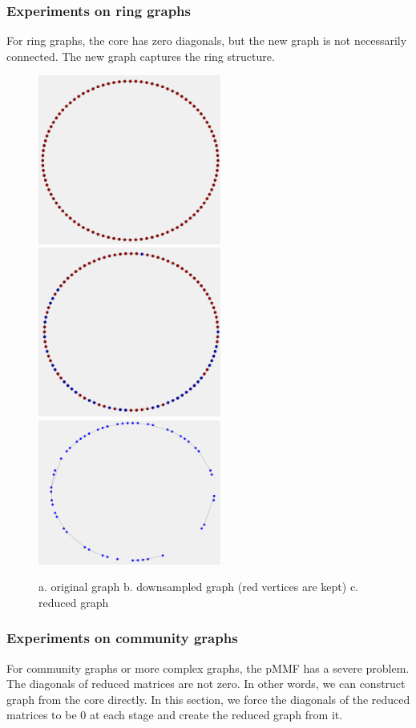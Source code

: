 \documentclass[a4paper]{article}
\begin{document}
\subsubsection{Experiments on ring graphs}
For ring graphs, the core has zero diagonals, but the new graph is not necessarily connected. The new graph captures the ring structure.
\begin{figure}[H]
\centering

\includegraphics[width = 6cm]{ring_graph/ring_graph}
\includegraphics[width = 6cm]{ring_graph/ring_graph_downsample}
\includegraphics[width = 6cm]{ring_graph/ring_graph_reduced}

\caption{a. original graph b. downsampled graph (red vertices are kept) c. reduced graph}
\end{figure}

\subsubsection{Experiments on community graphs}
For community graphs or more complex graphs, the pMMF has a severe problem. The diagonals of reduced matrices are not zero. In other words, we can construct graph from the core directly. In this section, we force the diagonals of the reduced matrices to be 0 at each stage and create the reduced graph from it.
\end{document}
